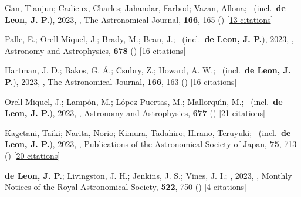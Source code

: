 \item[{\color{numcolor}\scriptsize56}] Gan, Tianjun; Cadieux, Charles; Jahandar, Farbod; Vazan, Allona; \etal\ (incl.\ \textbf{de Leon, J. P.}), 2023, , The Astronomical Journal, \textbf{166}, 165 () [\href{https://ui.adsabs.harvard.edu/abs/2023AJ....166..165G}{13 citations}]

\item[{\color{numcolor}\scriptsize55}] Palle, E.; Orell-Miquel, J.; Brady, M.; Bean, J.; \etal\ (incl.\ \textbf{de Leon, J. P.}), 2023, , Astronomy and Astrophysics, \textbf{678} () [\href{https://ui.adsabs.harvard.edu/abs/2023A&A...678A..80P}{16 citations}]

\item[{\color{numcolor}\scriptsize54}] Hartman, J. D.; Bakos, G. {\'A}.; Csubry, Z.; Howard, A. W.; \etal\ (incl.\ \textbf{de Leon, J. P.}), 2023, , The Astronomical Journal, \textbf{166}, 163 () [\href{https://ui.adsabs.harvard.edu/abs/2023AJ....166..163H}{16 citations}]

\item[{\color{numcolor}\scriptsize53}] Orell-Miquel, J.; Lamp{\'o}n, M.; L{\'o}pez-Puertas, M.; Mallorqu{\'\i}n, M.; \etal\ (incl.\ \textbf{de Leon, J. P.}), 2023, , Astronomy and Astrophysics, \textbf{677} () [\href{https://ui.adsabs.harvard.edu/abs/2023A&A...677A..56O}{21 citations}]

\item[{\color{numcolor}\scriptsize52}] Kagetani, Taiki; Narita, Norio; Kimura, Tadahiro; Hirano, Teruyuki; \etal\ (incl.\ \textbf{de Leon, J. P.}), 2023, , Publications of the Astronomical Society of Japan, \textbf{75}, 713 () [\href{https://ui.adsabs.harvard.edu/abs/2023PASJ...75..713K}{20 citations}]

\item[{\color{numcolor}\scriptsize51}] \textbf{de Leon, J. P.}; Livingston, J. H.; Jenkins, J. S.; Vines, J. I.; \etal, 2023, , Monthly Notices of the Royal Astronomical Society, \textbf{522}, 750 () [\href{https://ui.adsabs.harvard.edu/abs/2023MNRAS.522..750D}{4 citations}]

